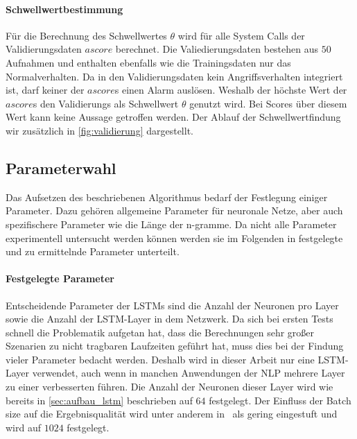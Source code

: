             \paragraph{Schwellwertbestimmung}\label{sec:Schwellung}
                Für die Berechnung des Schwellwertes $\theta$ wird für alle System Calls der Validierungsdaten $ascore$ berechnet.
                Die Valiedierungsdaten bestehen aus $50$ Aufnahmen und enthalten ebenfalls wie die Trainingsdaten nur das Normalverhalten.
                Da in den Validierungsdaten kein Angriffsverhalten integriert ist, darf keiner der $ascore$s einen Alarm auslösen.
                Weshalb der höchste Wert der $ascore$s den Validierungs als Schwellwert $\theta$ genutzt wird.
                Bei Scores über diesem Wert kann keine Aussage getroffen werden.
                Der Ablauf der Schwellwertfindung wir zusätzlich in \autoref{fig:validierung} dargestellt.

        \subsection{Parameterwahl}\label{sec:parameterwahl}
            Das Aufsetzen des beschriebenen Algorithmus bedarf der Festlegung einiger Parameter.
            Dazu gehören allgemeine Parameter für neuronale Netze, aber auch spezifischere Parameter wie die Länge der n-gramme.
            Da nicht alle Parameter experimentell untersucht werden können werden sie im Folgenden in festgelegte und zu ermittelnde Parameter unterteilt.
            \paragraph{Festgelegte Parameter}
                Entscheidende Parameter der \acp{LSTM} sind die Anzahl der Neuronen pro Layer sowie die Anzahl der \ac{LSTM}-Layer in dem Netzwerk.
                Da sich bei ersten Tests schnell die Problematik aufgetan hat, dass die Berechnungen sehr großer Szenarien zu nicht tragbaren Laufzeiten geführt hat, muss dies bei der Findung vieler Parameter bedacht werden.
                Deshalb wird in dieser Arbeit nur eine \ac{LSTM}-Layer verwendet, auch wenn in manchen Anwendungen der \ac{NLP} mehrere Layer zu einer verbesserten  führen.\cite{LSTMHYPERAUFA2020}
                Die Anzahl der Neuronen dieser Layer wird wie bereits in \autoref{sec:aufbau_lstm} beschrieben auf $64$ festgelegt.
                Der Einfluss der Batch size auf die Ergebnisqualität wird unter anderem in~\cite{LSTMBENCHBREUEL2015} als gering eingestuft und wird auf $1024$ festgelegt.
                 

